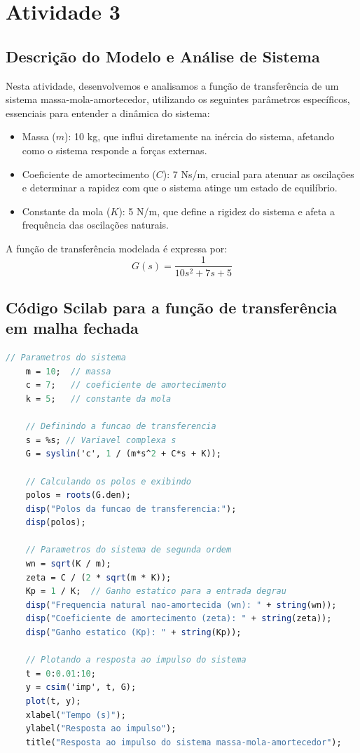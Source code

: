 \section{Atividade 3}

\subsection{Descrição do Modelo e Análise de Sistema}
Nesta atividade, desenvolvemos e analisamos a função de transferência de um sistema massa-mola-amortecedor, utilizando os seguintes parâmetros específicos, essenciais para entender a dinâmica do sistema:
\begin{itemize}
    \item Massa (\( m \)): 10 kg, que influi diretamente na inércia do sistema, afetando como o sistema responde a forças externas.
    \item Coeficiente de amortecimento (\( C \)): 7 Ns/m, crucial para atenuar as oscilações e determinar a rapidez com que o sistema atinge um estado de equilíbrio.
    \item Constante da mola (\( K \)): 5 N/m, que define a rigidez do sistema e afeta a frequência das oscilações naturais.
\end{itemize}
A função de transferência modelada é expressa por:
\[
    G(s) = \frac{1}{10s^2 + 7s + 5}
\]

\subsection{Código Scilab para a função de transferência em malha fechada}
\begin{lstlisting}[language=Scilab, caption=Código Scilab para a função de transferência em malha fechada]
    // Parametros do sistema
    m = 10;  // massa
    c = 7;   // coeficiente de amortecimento
    k = 5;   // constante da mola

    // Definindo a funcao de transferencia
    s = %s; // Variavel complexa s
    G = syslin('c', 1 / (m*s^2 + C*s + K));

    // Calculando os polos e exibindo
    polos = roots(G.den);
    disp("Polos da funcao de transferencia:");
    disp(polos);

    // Parametros do sistema de segunda ordem
    wn = sqrt(K / m);
    zeta = C / (2 * sqrt(m * K));
    Kp = 1 / K;  // Ganho estatico para a entrada degrau
    disp("Frequencia natural nao-amortecida (wn): " + string(wn));
    disp("Coeficiente de amortecimento (zeta): " + string(zeta));
    disp("Ganho estatico (Kp): " + string(Kp));

    // Plotando a resposta ao impulso do sistema
    t = 0:0.01:10;
    y = csim('imp', t, G);
    plot(t, y);
    xlabel("Tempo (s)");
    ylabel("Resposta ao impulso");
    title("Resposta ao impulso do sistema massa-mola-amortecedor");
\end{lstlisting}


